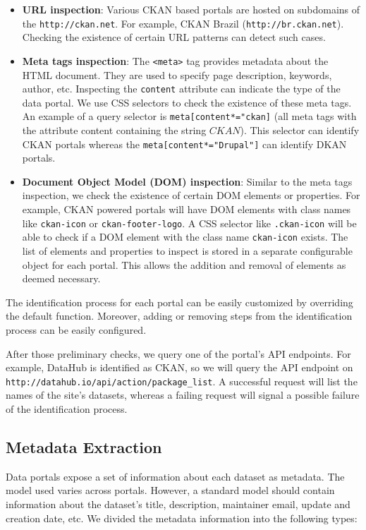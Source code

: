 \documentclass[runningheads,a4paper]{llncs}
\begin{document}
\begin{itemize}
  \item \textbf{URL inspection}: Various CKAN based portals are hosted on subdomains of the \texttt{http://ckan.net}. For example, CKAN Brazil (\texttt{http://br.ckan.net}). Checking the existence of certain URL patterns can detect such cases.
  \item \textbf{Meta tags inspection}: The \texttt{<meta>} tag provides metadata about the HTML document. They are used to specify page description, keywords, author, etc. Inspecting the \texttt{content} attribute can indicate the type of the data portal. We use CSS selectors to check the existence of these meta tags. An example of a query selector is \texttt{meta[content*="ckan]} (all meta tags with the attribute content containing the string $CKAN$). This selector can identify CKAN portals whereas the \texttt{meta[content*="Drupal"]} can identify DKAN portals.
  \item \textbf{Document Object Model (DOM) inspection}: Similar to the meta tags inspection, we check the existence of certain DOM elements or properties. For example, CKAN powered portals will have DOM elements with class names like \texttt{ckan-icon} or \texttt{ckan-footer-logo}. A CSS selector like \texttt{.ckan-icon} will be able to check if a DOM element with the class name \texttt{ckan-icon} exists.
  The list of elements and properties to inspect is stored in a separate configurable object for each portal. This allows the addition and removal of elements as deemed necessary.
\end{itemize}

The identification process for each portal can be easily customized by overriding the default function. Moreover, adding or removing steps from the identification process can be easily configured.

After those preliminary checks, we query one of the portal's API endpoints. For example, DataHub is identified as CKAN, so we will query the API endpoint on \texttt{http://datahub.io/api/action/package\_list}. A successful request will list the names of the site's datasets, whereas a failing request will signal a possible failure of the identification process.

\subsection{Metadata Extraction}

Data portals expose a set of information about each dataset as metadata. The model used varies across portals. However, a standard model should contain information about the dataset's title, description, maintainer email, update and creation date, etc. We divided the metadata information into the following types:
\end{document}
